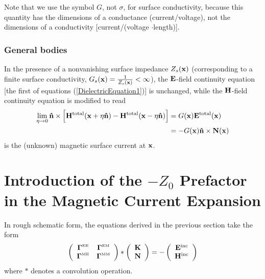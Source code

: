 \documentclass[letterpaper]{article}
\begin{document}
Note that we use the symbol $G$, not $\sigma$, for surface
conductivity, because this quantity has the dimensions of a 
conductance (current/voltage), not the dimensions of a conductivity
[current/(voltage $\cdot $length)].

\subsubsection*{General bodies} 

In the presence of a nonvanishing surface impedance $Z_s(\mathbf{x})$
(corresponding to a finite surface conductivity, 
 $G_s(\mathbf{x}) = \frac{1}{Z_s(\mathbf{x})} < \infty$),
the $\mathbf{E}$-field continuity equation [the first of equations
(\ref{DielectricEquation1})] is unchanged, while the $\mathbf{H}$-field
continuity equation is modified to read
\begin{subequations}
\begin{align}
 \lim_{\eta \to 0} \mathbf{\hat n}\times 
 \Big[ \mathbf{H}^{\hbox{\scriptsize{total}}}(\mathbf{x} + \eta\mathbf{\hat n})
      -\mathbf{H}^{\hbox{\scriptsize{total}}}(\mathbf{x} - \eta\mathbf{\hat n})
 \Big] 
&= G(\mathbf{x}) \mathbf{E}^{\hbox{\scriptsize{total}}}(\mathbf{x})
\\
&= -G(\mathbf{x}) \mathbf{\hat n} \times \mathbf{N}(\mathbf{x})
\label{DielectricEquationZS}
\end{align}
\end{subequations}
is the (unknown) magnetic surface current at $\mathbf{x}$.

\newpage
\section{Introduction of the $-Z_0$ Prefactor in the 
         Magnetic Current Expansion} 

In rough schematic form, the equations derived in the 
previous section take the form 
$$ \left( \begin{array}{cc}
   \boldsymbol{\Gamma}^{\hbox{\tiny{EE}}} & \boldsymbol{\Gamma}^{\hbox{\tiny{EM}}} \\
   \boldsymbol{\Gamma}^{\hbox{\tiny{ME}}} & \boldsymbol{\Gamma}^{\hbox{\tiny{MM}}} \\
   \end{array} \right)
   *
   \left( \begin{array}{c} \mathbf{K} \\  \mathbf{N}\end{array}\right)
   = 
   -
   \left( \begin{array}{c}
   \mathbf{E}^{\hbox{\scriptsize{inc}}} \\
   \mathbf{H}^{\hbox{\scriptsize{inc}}} \\
   \end{array}\right)
$$
where $*$ denotes a convolution operation.
\end{document}
